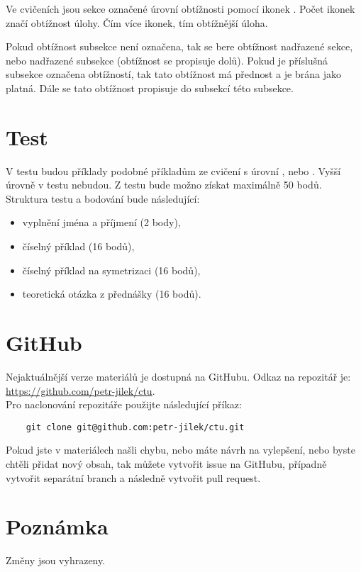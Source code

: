 \documentclass{article}
\begin{document}
Ve cvičeních jsou sekce označené úrovní obtížnosti pomocí ikonek \spicy. Počet ikonek značí obtížnost úlohy. Čím více ikonek, tím obtížnější úloha.

Pokud obtížnost subsekce není označena, tak se bere obtížnost nadřazené sekce, nebo nadřazené subsekce (obtížnost se propisuje dolů). Pokud je příslušná subsekce označena obtížností, tak tato obtížnost má přednost a je brána jako platná. Dále se tato obtížnost propisuje do subsekcí této subsekce.



\section{Test}
V testu budou příklady podobné příkladům ze cvičení s úrovní \spicy, nebo \spicy \spicy. Vyšší úrovně v testu nebudou. Z testu bude možno získat maximálně 50 bodů. Struktura testu a bodování bude následující:
\begin{itemize}
    \item vyplnění jména a příjmení (2 body),
    \item číselný příklad (16 bodů),
    \item číselný příklad na symetrizaci (16 bodů),
    \item teoretická otázka z přednášky (16 bodů).
\end{itemize}



\section{GitHub}
Nejaktuálnější verze materiálů je dostupná na GitHubu. Odkaz na repozitář je: \href{https://github.com/petr-jilek/ctu}{https://github.com/petr-jilek/ctu}.\\

Pro naclonování repozitáře použijte následující příkaz:

\begin{verbatim}
    git clone git@github.com:petr-jilek/ctu.git
\end{verbatim}

Pokud jste v materiálech našli chybu, nebo máte návrh na vylepšení, nebo byste chtěli přidat nový obsah, tak můžete vytvořit issue na GitHubu, případně vytvořit separátní branch a následně vytvořit pull request.



\section{Poznámka}
Změny jsou vyhrazeny.
\end{document}
